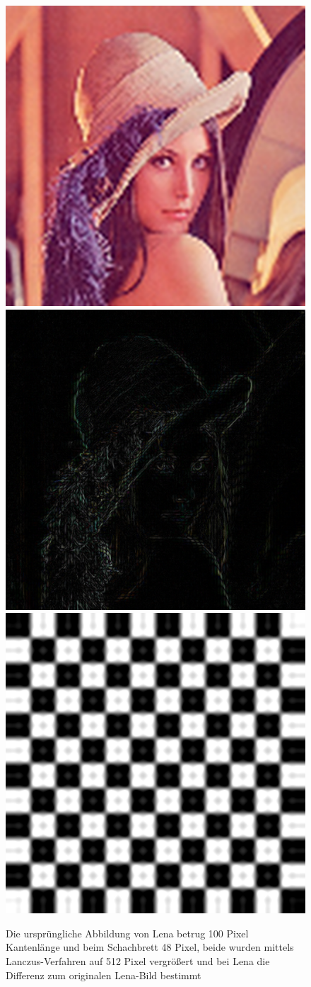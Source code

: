 \begin{figure}
	\centering
	\includegraphics[width=0.2\linewidth]{img/lena100_LANCZOS4}
	\includegraphics[width=0.2\linewidth]{img/lena100_LANCZOS4_differenz}
	\includegraphics[width=0.2\linewidth]{img/Schachbrett_LANCZOS4}
	\caption{Die ursprüngliche Abbildung von Lena betrug 100 Pixel Kantenlänge und beim Schachbrett 48 Pixel, beide wurden mittels Lanczus-Verfahren auf 512 Pixel vergrößert und bei Lena die Differenz  zum originalen Lena-Bild bestimmt}
	\label{img_Lanczos}
\end{figure}
